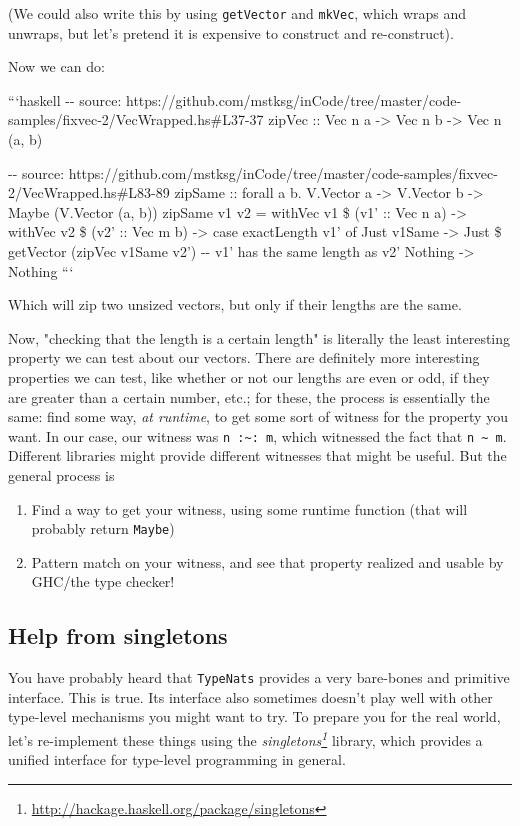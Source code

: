\documentclass[]{article}
\renewcommand{\href}[2]{#2\footnote{\url{#1}}}
\begin{document}
(We could also write this by using \texttt{getVector} and \texttt{mkVec}, which
wraps and unwraps, but let's pretend it is expensive to construct and
re-construct).

Now we can do:

```haskell -\/- source:
https://github.com/mstksg/inCode/tree/master/code-samples/fixvec-2/VecWrapped.hs\#L37-37
zipVec :: Vec n a -\textgreater{} Vec n b -\textgreater{} Vec n (a, b)

-\/- source:
https://github.com/mstksg/inCode/tree/master/code-samples/fixvec-2/VecWrapped.hs\#L83-89
zipSame :: forall a b. V.Vector a -\textgreater{} V.Vector b -\textgreater{}
Maybe (V.Vector (a, b)) zipSame v1 v2 = withVec v1 \$ (v1' :: Vec n a)
-\textgreater{} withVec v2 \$ (v2' :: Vec m b) -\textgreater{} case exactLength
v1' of Just v1Same -\textgreater{} Just \$ getVector (zipVec v1Same v2') -\/-
v1' has the same length as v2' Nothing -\textgreater{} Nothing ```

Which will zip two unsized vectors, but only if their lengths are the same.

Now, "checking that the length is a certain length" is literally the least
interesting property we can test about our vectors. There are definitely more
interesting properties we can test, like whether or not our lengths are even or
odd, if they are greater than a certain number, etc.; for these, the process is
essentially the same: find some way, \emph{at runtime}, to get some sort of
witness for the property you want. In our case, our witness was
\texttt{n\ :\textasciitilde{}:\ m}, which witnessed the fact that
\texttt{n\ \textasciitilde{}\ m}. Different libraries might provide different
witnesses that might be useful. But the general process is

\begin{enumerate}
\tightlist
\item
  Find a way to get your witness, using some runtime function (that will
  probably return \texttt{Maybe})
\item
  Pattern match on your witness, and see that property realized and usable by
  GHC/the type checker!
\end{enumerate}

\subsection{Help from singletons}

You have probably heard that \texttt{TypeNats} provides a very bare-bones and
primitive interface. This is true. Its interface also sometimes doesn't play
well with other type-level mechanisms you might want to try. To prepare you for
the real world, let's re-implement these things using the
\emph{\href{http://hackage.haskell.org/package/singletons}{singletons}} library,
which provides a unified interface for type-level programming in general.
\end{document}
